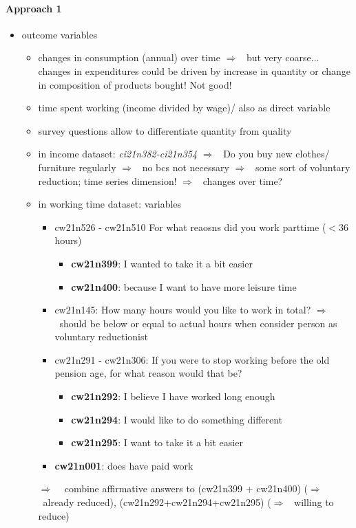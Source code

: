 \documentclass[12pt]{article}
\newcommand{\ar}{$\Rightarrow$ \ }
\begin{document}
\paragraph{Approach 1}
\begin{itemize}
	\item outcome variables
	\begin{itemize}

\item changes in consumption (annual) over time \ar but very coarse... changes in expenditures could be driven by increase in quantity or change in composition of products bought! Not good!
\item time spent working (income divided by wage)/ also as direct variable
\item survey questions allow to differentiate quantity from quality 
\item in income dataset: \textit{ci21n382-ci21n354} \ar Do you buy new clothes/ furniture regularly \ar no bcs not necessary \ar some sort of voluntary reduction; time series dimension! \ar changes over time?
\item in working time dataset: variables
\begin{itemize}
\item cw21n526 - cw21n510 For what reaosns did you work parttime ($<$36 hours)
\begin{itemize}
\item \textbf{cw21n399}: I wanted to take it a bit easier
\item \textbf{cw21n400}: because I want to have more leisure time
\end{itemize}
\item cw21n145: How many hours would you like to work in total? \ar should be below or equal to actual hours when consider person as voluntary reductionist
\item cw21n291 - cw21n306: If you were to stop working before the old pension age, for what reason would that be?
\begin{itemize}
\item \textbf{cw21n292}: I believe I have worked long enough
\item \textbf{cw21n294}: I would like to do something different
\item \textbf{cw21n295}: I want to take it a bit easier
\end{itemize}
\item \textbf{cw21n001}: does have paid work
\end{itemize}
\item[\ar] combine affirmative answers to (cw21n399 + cw21n400) (\ar already reduced), (cw21n292+cw21n294+cw21n295) (\ar willing to reduce)

\end{itemize}
\end{itemize}
\end{document}
